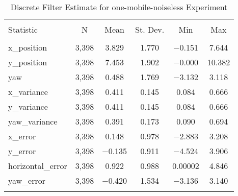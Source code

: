 
\begin{table}[h] \centering 
  \caption{Discrete Filter Estimate for one-mobile-noiseless Experiment} 
  \label{tab:one_mobile_noiseless_discrete_summary} 
\begin{tabular}{@{\extracolsep{5pt}}lccccc} 
\\[-1.8ex]\hline 
\hline \\[-1.8ex] 
Statistic & \multicolumn{1}{c}{N} & \multicolumn{1}{c}{Mean} & \multicolumn{1}{c}{St. Dev.} & \multicolumn{1}{c}{Min} & \multicolumn{1}{c}{Max} \\ 
\hline \\[-1.8ex] 
x\_position & 3,398 & 3.829 & 1.770 & $-$0.151 & 7.644 \\ 
y\_position & 3,398 & 7.453 & 1.902 & $-$0.000 & 10.382 \\ 
yaw & 3,398 & 0.488 & 1.769 & $-$3.132 & 3.118 \\ 
x\_variance & 3,398 & 0.411 & 0.145 & 0.084 & 0.666 \\ 
y\_variance & 3,398 & 0.411 & 0.145 & 0.084 & 0.666 \\ 
yaw\_variance & 3,398 & 0.391 & 0.173 & 0.090 & 0.694 \\ 
x\_error & 3,398 & 0.148 & 0.978 & $-$2.883 & 3.208 \\ 
y\_error & 3,398 & $-$0.135 & 0.911 & $-$4.524 & 3.906 \\ 
horizontal\_error & 3,398 & 0.922 & 0.988 & 0.00002 & 4.846 \\ 
yaw\_error & 3,398 & $-$0.420 & 1.534 & $-$3.136 & 3.140 \\ 
\hline \\[-1.8ex] 
\end{tabular} 
\end{table} 
